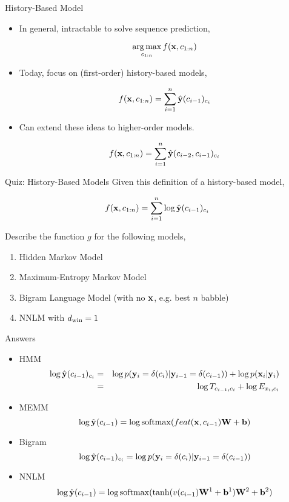 \documentclass{beamer}
\begin{document}
\begin{frame}{History-Based Model}
  \begin{itemize}
  \item In general, intractable to solve sequence prediction,
 
  \[ \argmax_{c_{1:n}} f(\boldx, c_{1:n}) \] 

  \item Today, focus on (first-order) history-based models,

  \[ f(\mathbf{x}, c_{1:n})  = \sum_{i=1}^n \hat{\mathbf{y}}(c_{i-1})_{c_i}\] 

  \item Can extend these ideas to higher-order models.

  \[ f(\mathbf{x}, c_{1:n})  = \sum_{i=1}^n \hat{\mathbf{y}}(c_{i-2}, c_{i-1})_{c_i}\] 
  \end{itemize}  
  
\end{frame}

\begin{frame}{Quiz: History-Based Models}
  Given this definition of a history-based model, 

  \[ f(\mathbf{x}, c_{1:n})  = \sum_{i=1}^n \log \hat{\mathbf{y}}(c_{i-1})_{c_i} \] 

  Describe the function $g$ for the following models, 

  \begin{enumerate}
  \item Hidden Markov Model
  \item Maximum-Entropy Markov Model
  \item Bigram Language Model (with no $\mathbf{x}$, e.g. best $n$ babble)
  \item NNLM with ${d_{\mathrm{win}}}=1$
  \end{enumerate}
\end{frame}


\begin{frame}{Answers}
  \begin{itemize}
  \item HMM
    \begin{eqnarray*}
      \log \hat{\mathbf{y}}(c_{i-1})_{c_i} &=& \log p(\mathbf{y}_i = \delta(c_{i}) | \mathbf{y}_{i-1}=\delta(c_{i-1})) + \log p(\mathbf{x}_i| \mathbf{y}_i )  \\
                                       &=& \log T_{c_{i-1}, c_i}  + \log E_{x_i, c_i}
    \end{eqnarray*}


    \pause 

  \item MEMM
    \[\log \hat{\boldy}(c_{i-1}) = \log \softmax(feat(\boldx, c_{i-1}) \boldW + \boldb)  \]
    \pause 

  \item Bigram 
    \[\log \hat{\mathbf{y}}(c_{i-1})_{c_i} = \log p(\mathbf{y}_i = \delta(c_{i}) | \mathbf{y}_{i-1}=\delta(c_{i-1}))  \]
    \pause 

  \item NNLM 
    \[\log \hat{\boldy}(c_{i-1}) = \log \softmax(\tanh(v(c_{i-1}) \boldW^1 + \boldb^1) \boldW^2 + \boldb^2)  \]

  \end{itemize}
\end{frame}
\end{document}
